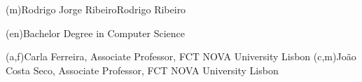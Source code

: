 

\ntauthorname(m){Rodrigo Jorge Ribeiro}{Rodrigo Ribeiro}

\ntauthordegree(en){Bachelor Degree in Computer Science}


(a,f){Carla Ferreira, Associate Professor, FCT NOVA University Lisbon}
(c,m){João Costa Seco, Associate Professor, FCT NOVA University Lisbon}

